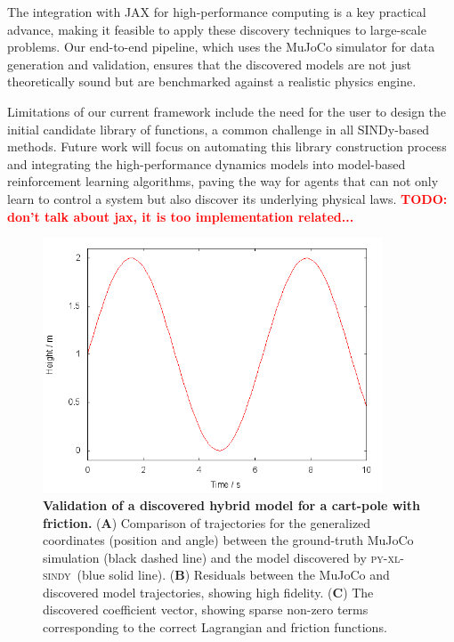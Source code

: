 \documentclass[12pt]{article}
\newcommand{\frameworkname}{\textsc{py-xl-sindy}}
\newcommand{\TODO}[1]{\textbf{\textcolor{red}{\Large TODO: \normalsize #1}}}
\begin{document}
The integration with JAX for high-performance computing is a key practical advance, making it feasible to apply these discovery techniques to large-scale problems. Our end-to-end pipeline, which uses the MuJoCo simulator for data generation and validation, ensures that the discovered models are not just theoretically sound but are benchmarked against a realistic physics engine.

Limitations of our current framework include the need for the user to design the initial candidate library of functions, a common challenge in all SINDy-based methods. Future work will focus on automating this library construction process and integrating the high-performance dynamics models into model-based reinforcement learning algorithms, paving the way for agents that can not only learn to control a system but also discover its underlying physical laws.
\TODO{don't talk about jax, it is too implementation related...}

\newpage


\begin{figure}
	\centering
	\includegraphics[width=0.9\textwidth]{placeholder.png}
	\caption{\textbf{Validation of a discovered hybrid model for a cart-pole with friction.} 
    (\textbf{A}) Comparison of trajectories for the generalized coordinates (position and angle) between the ground-truth MuJoCo simulation (black dashed line) and the model discovered by \frameworkname\ (blue solid line). (\textbf{B}) Residuals between the MuJoCo and discovered model trajectories, showing high fidelity. (\textbf{C}) The discovered coefficient vector, showing sparse non-zero terms corresponding to the correct Lagrangian and friction functions.}
	\label{fig:trajectory_validation}
\end{figure}
\end{document}

